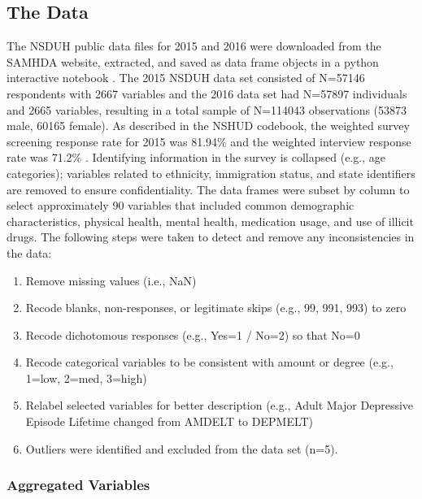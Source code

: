 \documentclass[sigconf]{acmart}
\begin{document}
\subsection{The Data}

The NSDUH public data files for 2015 and 2016 were downloaded from the SAMHDA 
website, extracted, and saved as data frame objects in a python interactive 
notebook \cite{mckinney17, vanderplas17}. The 2015 NSDUH data set consisted 
of N=57146 respondents with 2667 variables and the 2016 data set had N=57897 
individuals and 2665 variables, resulting in a total sample of N=114043 
observations (53873 male, 60165 female). As described in the NSHUD codebook, 
the weighted survey screening response rate for 2015 was 81.94\% and the 
weighted interview response rate was 71.2\% \cite{samhsa18}. Identifying 
information in the survey is collapsed (e.g., age categories); variables 
related to ethnicity, immigration status, and state identifiers are removed 
to ensure confidentiality. The data frames were subset by column to select 
approximately 90 variables that included common demographic characteristics, 
physical health, mental health, medication usage, and use of illicit drugs. 
The following steps were taken to detect and remove any inconsistencies in 
the data:

\begin{enumerate}
  \item Remove missing values (i.e., NaN) 
  \item Recode blanks, non-responses, or legitimate skips (e.g., 99, 991, 
  993) to zero  
  \item Recode dichotomous responses (e.g., Yes=1 / No=2) so that No=0
  \item Recode categorical variables to be consistent with amount or degree 
  (e.g., 1=low, 2=med, 3=high)
   \item Relabel selected variables for better description (e.g., 
   Adult Major Depressive Episode Lifetime changed from AMDELT to DEPMELT)
   \item Outliers were identified and excluded from the data set (n=5).
\end{enumerate}

\subsubsection{Aggregated Variables}
\end{document}
